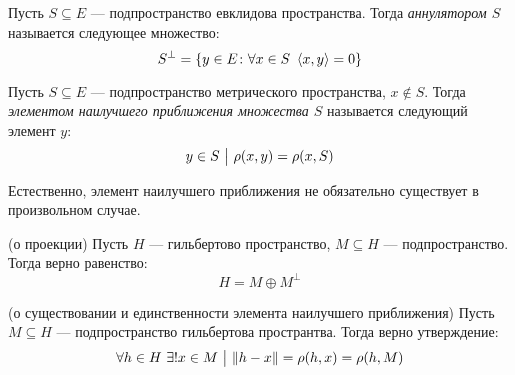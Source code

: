 \begin{definition}
	Пусть $S \subseteq E$ --- подпространство евклидова пространства. Тогда \textit{аннулятором $S$} называется следующее множество:
	\[
		S^\bot = \{y \in E \colon \forall x \in S\ \left\langle x, y\right\rangle = 0\}
	\]
\end{definition}

\begin{definition}
	Пусть $S \subseteq E$ --- подпространство метрического пространства, $x \notin S$. Тогда \textit{элементом наилучшего приближения множества $S$} называется следующий элемент $y$:
	\[
		y \in S \ \big|\  \rho(x, y) = \rho(x, S)
	\]
\end{definition}

\begin{note}
	Естественно, элемент наилучшего приближения не обязательно существует в произвольном случае.
\end{note}

\begin{theorem} (о проекции)
	Пусть $H$ --- гильбертово пространство, $M \subseteq H$ --- подпространство. Тогда верно равенство:
	\[
		H = M \oplus M^\bot
	\]
\end{theorem}

\begin{lemma} (о существовании и единственности элемента наилучшего приближения)
	Пусть $M \subseteq H$ --- подпространство гильбертова пространтва. Тогда верно утверждение:
	\[
		\forall h \in H\ \exists! x \in M \ \big|\  \|h - x\| = \rho(h, x) = \rho(h, M)
	\]
\end{lemma}

